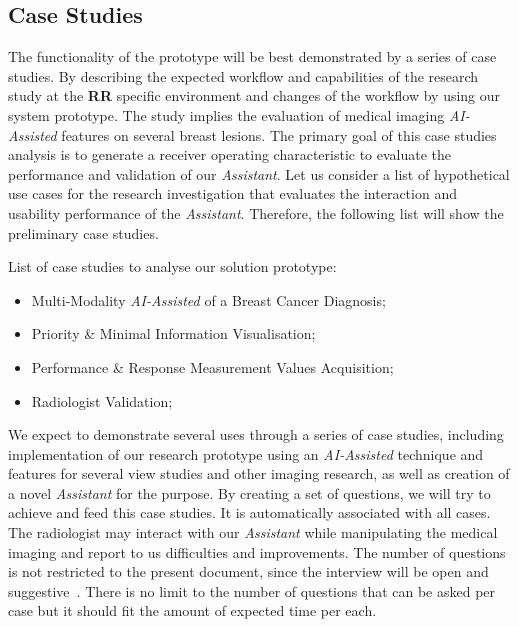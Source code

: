 
\subsection{Case Studies}

The functionality of the prototype will be best demonstrated by a series of case studies. By describing the expected workflow and capabilities of the research study at the \textbf{RR} specific environment and changes of the workflow by using our system prototype. The study implies the evaluation of medical imaging \textit{AI-Assisted} features on several breast lesions. The primary goal of this case studies analysis is to generate a receiver operating characteristic to evaluate the performance and validation of our \textit{Assistant}. Let us consider a list of hypothetical use cases for the research investigation that evaluates the interaction and usability performance of the \textit{Assistant}. Therefore, the following list will show the preliminary case studies.

\hfill

List of case studies to analyse our solution prototype:

\hfill

\begin{itemize}
\item Multi-Modality \textit{AI-Assisted} of a Breast Cancer Diagnosis;
\item Priority \& Minimal Information Visualisation;
\item Performance \& Response Measurement Values Acquisition;
\item Radiologist Validation;
\end{itemize}

\hfill


We expect to demonstrate several uses through a series of case studies, including implementation of our research prototype using an \textit{AI-Assisted} technique and features for several view studies and other imaging research, as well as creation of a novel \textit{Assistant} for the purpose. By creating a set of questions, we will try to achieve and feed this case studies. It is automatically associated with all cases. The radiologist may interact with our \textit{Assistant} while manipulating the medical imaging and report to us difficulties and improvements. The number of questions is not restricted to the present document, since the interview will be open and suggestive~\cite{joyce2017healthcare}. There is no limit to the number of questions that can be asked per case but it should fit the amount of expected time per each.

